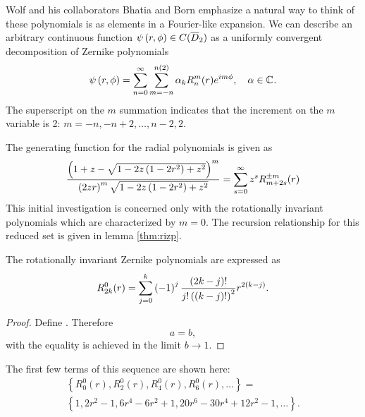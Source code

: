 \documentclass[preprint,12pt]{elsarticle}
\begin{document}
Wolf and his collaborators Bhatia \cite{Wolf} and Born \cite{BW} emphasize a natural way to think of these polynomials is as elements in a Fourier-like expansion. We can describe an arbitrary continuous function $\psi\left( r, \phi \right)\in C(\overline{D}_{2})$ as a uniformly convergent decomposition of Zernike polynomials
\begin{equation}
  \psi\left( r, \phi \right) = \sum_{n=0}^{\infty}\sum_{m=-n}^{n(2)} \alpha_{k} R_{n}^{m}(r) e^{i m \phi}, \quad \alpha\in\mathbb{C}^{} .
\end{equation}
The superscript on the $m$ summation indicates that the increment on the $m$ variable is 2: $m = -n, -n+2, \dots, n-2, 2$.

The generating function for the radial polynomials is given as \cite[p. 525]{BW}
\begin{equation}
  \frac{\left( 1+z-\sqrt{1-2z\left( 1-2r^{2} \right)+z^{2}} \right)^{m}} {\left( 2zr \right)^{m} \sqrt{1-2z\left( 1-2r^{2} \right)+z^{2}}} = \sum_{s=0}^{\infty} z^{s} R_{m+2s}^{\pm m}(r)
  \label{eq:zernikegen}
\end{equation}
This initial investigation is concerned only with the rotationally invariant polynomials which are characterized by $m=0$. The recursion relationship for this reduced set is given in lemma \ref{thm:rizp}.
{\color{blue}
\begin{myTheorem}  %
The rotationally invariant Zernike polynomials are expressed as
\begin{equation}
  R_{2k}^{0}(r) = \sum_{j=0}^{k}{\left( -1 \right)^j\frac{(2k-j)!}{j!\left( \left( k-j \right)! \right)^{2}}r^{2(k-j)}} .
  \label{eq:reduced}
\end{equation}
\label{thm:rizp}
\end{myTheorem}  %
\begin{proof}  %
Define . Therefore
  \begin{equation}
   a = b ,
  \end{equation}
with the equality is achieved in the limit $b\to 1$.
\end{proof}  %
}
The first few terms of this sequence are shown here:
\begin{multline}
\left\{ R_{0}^{0}(r),  R_{2}^{0}(r),  R_{4}^{0}(r),  R_{6}^{0}(r), \dots \right\} = \\
  \left\{1, 2r^2-1, 6r^4-6 r^2+1, 20r^6-30 r^4 + 12 r^2-1, \dots \right\}.
\end{multline}
\end{document}
